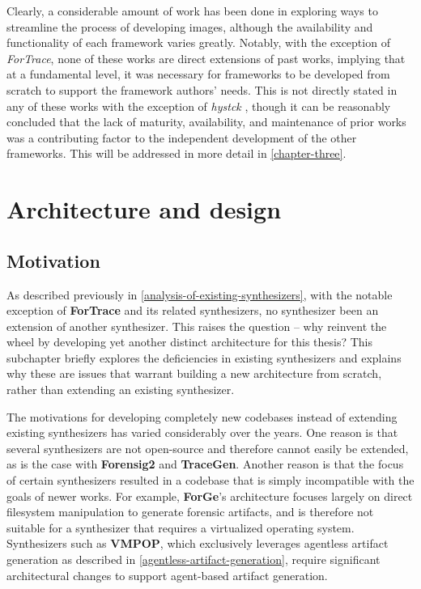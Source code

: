 \documentclass[letterpaper,12pt]{report}
\begin{document}
Clearly, a considerable amount of work has been done in exploring ways
to streamline the process of developing images, although the
availability and functionality of each framework varies greatly.
Notably, with the exception of \emph{ForTrace}, none of these works are
direct extensions of past works, implying that at a fundamental level,
it was necessary for frameworks to be developed from scratch to support
the framework authors' needs. This is not directly stated in any of
these works with the exception of \emph{hystck}
\cite{gobelNovelApproachGenerating2020}, though it can be reasonably
concluded that the lack of maturity, availability, and maintenance of
prior works was a contributing factor to the independent development of
the other frameworks. This will be addressed in more detail in
\autoref{chapter-three}.

\chapter{Architecture and design}\label{chapter-three}

\section{Motivation}\label{motivation}

As described previously in \autoref{analysis-of-existing-synthesizers}, with the notable exception of
\textbf{ForTrace} and its related synthesizers, no synthesizer been an
extension of another synthesizer. This raises the question -- why
reinvent the wheel by developing yet another distinct architecture for
this thesis? This subchapter briefly explores the deficiencies in
existing synthesizers and explains why these are issues that warrant
building a new architecture from scratch, rather than extending an
existing synthesizer.

The motivations for developing completely new codebases instead of
extending existing synthesizers has varied considerably over the years.
One reason is that several synthesizers are not open-source and
therefore cannot easily be extended, as is the case with
\textbf{Forensig2} and \textbf{TraceGen}. Another reason is that the
focus of certain synthesizers resulted in a codebase that is simply
incompatible with the goals of newer works. For example,
\textbf{ForGe}'s architecture focuses largely on direct filesystem
manipulation to generate forensic artifacts, and is therefore not
suitable for a synthesizer that requires a virtualized operating system.
Synthesizers such as \textbf{VMPOP}, which exclusively leverages
agentless artifact generation as described in \autoref{agentless-artifact-generation}, require significant
architectural changes to support agent-based artifact generation.
\end{document}
